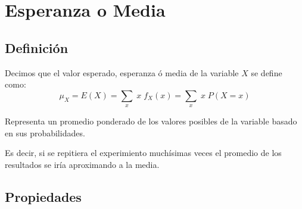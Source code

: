\documentclass[12pt, fleqn]{report}                             %
\theoremstyle{break}                                            %
\begin{document}
        \clearpage
        \section{Esperanza o Media}

            \subsection{Definición}

                Decimos que el valor esperado, esperanza ó media de la variable $X$
                se define como:
                \begin{equation*}
                    \mu_{X} = E(X) = \sum_x \; x \; f_X(x) = \sum_x \; x \; P(X = x)
                \end{equation*}

                Representa un promedio ponderado de los valores posibles de la variable basado en
                sus probabilidades.

                Es decir, si se repitiera el experimiento muchísimas veces el promedio de los resultados
                se iría aproximando a la media.

            \vspace{1em}
            \subsection{Propiedades}
\end{document}
